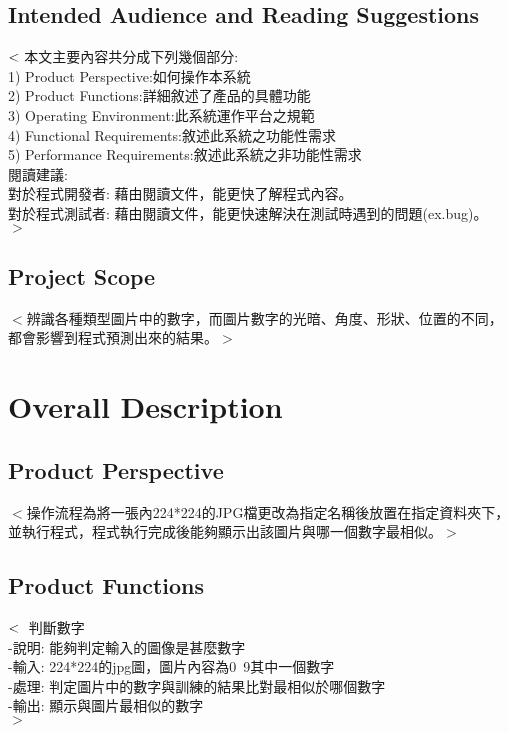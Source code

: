 \documentclass{scrreprt}
\begin{document}
\begin{CJK*}{UTF8}{bsmi}
\section{Intended Audience and Reading Suggestions}
$<\\$本文主要內容共分成下列幾個部分:\\
  1) Product Perspective:如何操作本系統\\
  2) Product Functions:詳細敘述了產品的具體功能\\
  3) Operating Environment:此系統運作平台之規範\\
  4) Functional Requirements:敘述此系統之功能性需求\\
  5) Performance Requirements:敘述此系統之非功能性需求\\
閱讀建議:\\
對於程式開發者: 藉由閱讀文件，能更快了解程式內容。\\
對於程式測試者: 藉由閱讀文件，能更快速解決在測試時遇到的問題(ex.bug)。\\
$>$

\section{Project Scope}
$<$辨識各種類型圖片中的數字，而圖片數字的光暗、角度、形狀、位置的不同，都會影響到程式預測出來的結果。$>$


\chapter{Overall Description}

\section{Product Perspective}
$<$操作流程為將一張內224*224的JPG檔更改為指定名稱後放置在指定資料夾下，並執行程式，程式執行完成後能夠顯示出該圖片與哪一個數字最相似。$>$

\section{Product Functions}
$<\\$
\hspace{2cm}判斷數字\\
\hspace{4cm}-說明: 能夠判定輸入的圖像是甚麼數字\\
\hspace{4cm}-輸入: 224*224的jpg圖，圖片內容為0~9其中一個數字\\
\hspace{4cm}-處理: 判定圖片中的數字與訓練的結果比對最相似於哪個數字\\
\hspace{4cm}-輸出: 顯示與圖片最相似的數字\\$>$


\end{CJK*}
\end{document}
